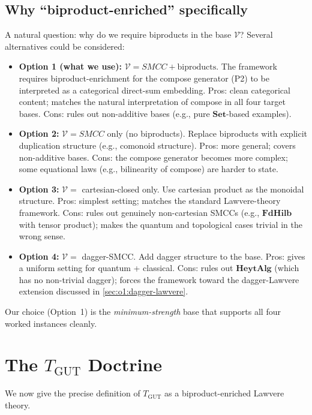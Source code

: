 \documentclass[11pt,a4paper]{article}
\theoremstyle{plain}
\theoremstyle{definition}
\theoremstyle{remark}
\newcommand{\cat}[1]{\mathbf{#1}}
\newcommand{\Set}{\cat{Set}}
\newcommand{\HeytAlg}{\cat{HeytAlg}}
\newcommand{\FdHilb}{\cat{FdHilb}}
\newcommand{\TGUT}{T_{\mathrm{GUT}}}
\newcommand{\smcc}{SMCC}
\begin{document}
\subsection{Why ``biproduct-enriched'' specifically}\label{sec:background:bip}

A natural question: why do we require biproducts in the base $\mathcal{V}$? Several alternatives could be considered:

\begin{itemize}[leftmargin=*]
\item \textbf{Option 1 (what we use):} $\mathcal{V} = \smcc + \text{biproducts}$. The framework requires biproduct-enrichment for the compose generator (P2) to be interpreted as a categorical direct-sum embedding. Pros: clean categorical content; matches the natural interpretation of compose in all four target bases. Cons: rules out non-additive bases (e.g., pure $\Set$-based examples).
\item \textbf{Option 2:} $\mathcal{V} = \smcc$ only (no biproducts). Replace biproducts with explicit duplication structure (e.g., comonoid structure). Pros: more general; covers non-additive bases. Cons: the compose generator becomes more complex; some equational laws (e.g., bilinearity of compose) are harder to state.
\item \textbf{Option 3:} $\mathcal{V} =$ cartesian-closed only. Use cartesian product as the monoidal structure. Pros: simplest setting; matches the standard Lawvere-theory framework. Cons: rules out genuinely non-cartesian \smcc{}s (e.g., $\FdHilb$ with tensor product); makes the quantum and topological cases trivial in the wrong sense.
\item \textbf{Option 4:} $\mathcal{V} = $ dagger-\smcc. Add dagger structure to the base. Pros: gives a uniform setting for quantum + classical. Cons: rules out $\HeytAlg$ (which has no non-trivial dagger); forces the framework toward the dagger-Lawvere extension discussed in \cref{sec:o1:dagger-lawvere}.
\end{itemize}

Our choice (Option~1) is the \emph{minimum-strength} base that supports all four worked instances cleanly.

\section{The $\TGUT$ Doctrine}\label{sec:tgut}

We now give the precise definition of $\TGUT$ as a biproduct-enriched Lawvere theory.
\end{document}
